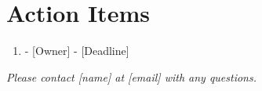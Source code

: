 \section{Action Items}


\begin{enumerate}
    \item [Action] - [Owner] - [Deadline]
\end{enumerate}


\vspace{1cm}

\noindent\textit{Please contact [name] at [email] with any questions.}

